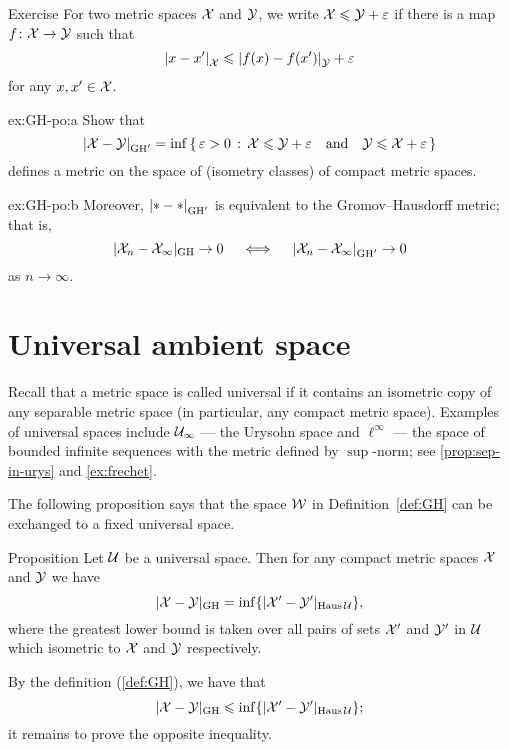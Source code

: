 \begin{thm}{Exercise}\label{ex:GH-po}
For two metric spaces $\mathcal{X}$ and $\mathcal{Y}$,
we write $\mathcal{X}\leqslant \mathcal{Y}+\varepsilon$ if
there is a map $f\colon\mathcal{X}\to \mathcal{Y}$ such that 
\[\dist{x}{x'}{\spc{X}}\le \dist{f(x)}{f(x')}{\spc{Y}}+\eps\]
for any $x,x'\in \mathcal{X}$.

\begin{subthm}{ex:GH-po:a}
Show that 
$$\dist{\spc{X}}{\spc{Y}}{\GH'}=\inf\set{\eps>0}{\spc{X}\le \spc{Y}+\eps
\quad\text{and}\quad
\spc{Y}\le \spc{X}+\eps}$$
defines a metric on the space of (isometry classes) of compact metric spaces.
\end{subthm}

\begin{subthm}{ex:GH-po:b}
Moreover, $\dist{*}{*}{\GH'}$ is equivalent to the Gromov--Hausdorff metric;
that is,
$$|\spc{X}_n-\spc{X}_\infty|_{\GH}\to 0 
\quad\iff\quad 
\dist{\spc{X}_n}{\spc{X}_\infty}{\GH'}\to 0$$ 
as $n\to\infty$.
\end{subthm}
\end{thm}

\section{Universal ambient space}

Recall that a metric space is called universal if it contains an isometric copy of any separable metric space (in particular, any compact metric space).
Examples of universal spaces include $\mathcal{U}_\infty$ --- the Urysohn space and $\ell^\infty$ --- the space of bounded infinite sequences with the metric defined by $\sup$-norm; see \ref{prop:sep-in-urys} and \ref{ex:frechet}.

The following proposition says that the space $\mathcal{W}$ in Definition~\ref{def:GH} can be exchanged to a fixed universal space.

\begin{thm}{Proposition}\label{prop:GH-with-fixed-Z}
Let $\mathcal{U}$ be a universal space.
Then for any compact metric spaces $\mathcal{X}$ and $\mathcal{Y}$ we have
$$|\mathcal{X}-\mathcal{Y}|_{\operatorname{\rm GH}\nolimits} = \inf \{|\mathcal{X}'-\mathcal{Y}'|_{\operatorname{\rm Haus}\nolimits\mathcal{U}}\},$$ 
where the greatest lower bound is taken over all pairs of sets $\mathcal{X}'$ and $\mathcal{Y}'$ in $\mathcal{U}$
which isometric to  $\mathcal{X}$ and $\mathcal{Y}$ respectively.  
\end{thm}




By the definition (\ref{def:GH}), we have that 
\[|\mathcal{X}-\mathcal{Y}|_{\operatorname{\rm GH}\nolimits} \leqslant \inf \{|\mathcal{X}'-\mathcal{Y}'|_{\operatorname{\rm Haus}\nolimits\mathcal{U}}\};\]
it remains to prove the opposite inequality.

